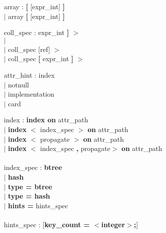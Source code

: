\begin{tabbing}
\grindent
array \> : {\bf [} [expr\_int] {\bf ]}\\
\> $|$ array {\bf [} [expr\_int] {\bf ]}
\end{tabbing}

\begin{tabbing}
\grindent
coll\_spec \> : \ident {\bf $<$} \ident {\bf [} expr\_int {\bf ]} {\bf $>$}\\
\> $|$ \ident {\bf $<$} \ident [ref] {\bf $>$}\\
\> $|$ \ident {\bf $<$} coll\_spec [ref] {\bf $>$}\\
\> $|$ \ident {\bf $<$} coll\_spec {\bf [} expr\_int {\bf ]} {\bf $>$}
\end{tabbing}

\begin{tabbing}
\grindent
attr\_hint \> : index\\
\> $|$ notnull\\
\> $|$ implementation\\
\> $|$ card
\end{tabbing}

\begin{tabbing}
\grindent
index \> : {\bf index on} attr\_path\\
\> $|$ {\bf index} {\bf $<$} index\_spec {\bf $>$} {\bf on} attr\_path\\
\> $|$ {\bf index} {\bf $<$} propagate {\bf $>$} {\bf on} attr\_path\\
\> $|$ {\bf index} {\bf $<$} index\_spec {\bf ,} propagate{\bf $>$} {\bf on} attr\_path\\
\\
index\_spec \> : {\bf btree} \\
\> $|$ {\bf hash}\\
\> $|$ {\bf type = btree}\\
\> $|$ {\bf type = hash}\\
\> $|$ {\bf hints =} hints\_spec\\
\\
hints\_spec \> : [{\bf key\_count = $<$integer$>$;}]\\
\>[{\bf initial\_size = $<$integer$>$;}]\\
\>[{\bf initial\_object\_count = $<$integer$>$;}]\\
\>[{\bf extend\_coef = $<$integer$>$;}]\\
\>[{\bf size\_max = $<$integer$>$;}]\\
\>[{\bf key\_function = $<$class$>$::$<$method$>$;}]\\
\>[{\bf dataspace = }\ident{\bf ;}]
\end{tabbing}

